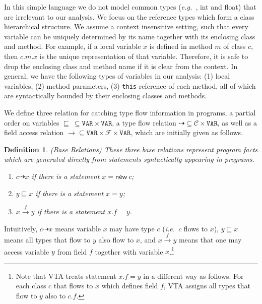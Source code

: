 \documentclass{fac}
\newcommand\eg{\textit{e.g.\ }}
\newcommand\ie{\textit{i.e.\ }}
\newtheorem{Definition}{Definition}
\newcommand{\keyword}[1]{\mathsf{#1}}
\newcommand{\kwnew}[0]{\keyword{new}}
\newcommand\Var{\mathtt{VAR}}
\newcommand{\Class}{\mathcal{C}}
\newcommand{\Field}{\mathcal{F}}
\newcommand{\less}{\sqsubseteq}
\newcommand{\tflow}{\dashrightarrow}
\newcommand{\hflow}{\longrightarrow}
\newcommand{\lhflow}[1]{\stackrel{#1}{\hflow}}
\begin{document}
In this simple language we do not model common types (\eg, int and float) that are irrelevant to our analysis. We focus on the reference types which form a class hierarchical structure. We assume a context insensitive setting, such that every variable can be uniquely determined by its name together with its enclosing class and method.
For example, if a local variable $x$ is defined in method $m$ of class $c$, then $c.m.x$ is the unique representation of that variable. Therefore, it is safe to drop the enclosing class and method name if it is clear from the context.
In general, we have the following types of variables in our analysis: (1) local variables, (2) method parameters, (3) \texttt{this} reference of each method, all of which are syntactically bounded by their enclosing classes and methods.

We define three relation for catching type flow information in programs, a partial order on variables $\less\ \subseteq\Var\times\Var$, a type flow relation
$\tflow\subseteq\Class\times\Var$, as well as a field access relation $\hflow\subseteq\Var\times\Field\times\Var$,
which are initially given as follows.

\begin{Definition}\label{def:base} (Base Relations)
These three base relations represent program facts which are generated directly %
from statements syntactically appearing in programs.
\begin{enumerate}
  \item $c\tflow x$ if there is a statement $x = \kwnew\ c$;
  \item $y\less x$ if there is a statement $x = y $;
  \item $x\lhflow{f}y$ if there is a statement $x.f = y$.
\end{enumerate}
\end{Definition}

Intuitively, $c\tflow x$ means variable $x$ may have type $c$ (\ie $c$ flows to $x$), $y\less x$ means all types that flow to $y$ also flow to $x$, and $x\lhflow{f}y$ means that one may access variable $y$ from field $f$ together with variable $x$.\footnote{Note that VTA treats statement $x.f = y$ in a different way as follows. For each class $c$ that flows to $x$ which defines field $f$, VTA assigns all types that flow to $y$ also to $c.f$.}
\end{document}
